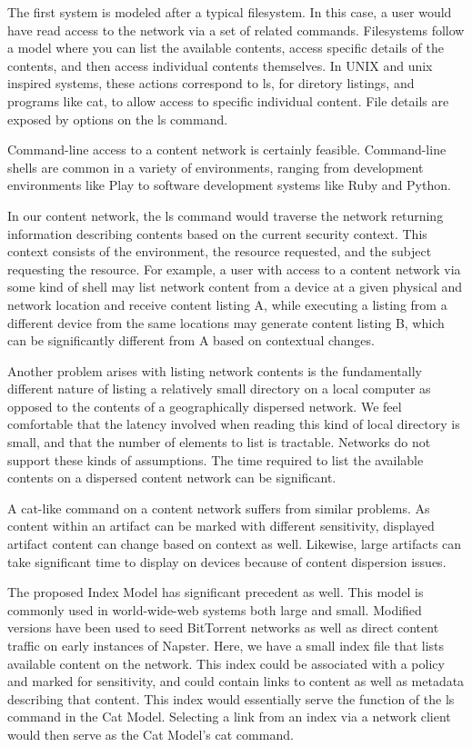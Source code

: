 The first system is modeled after a typical filesystem.  In this case, a user would have read access to the network via a set of related commands.  Filesystems follow a model where you can list the available contents, access specific details of the contents, and then access individual contents themselves.  In UNIX and unix inspired systems, these actions correspond to ls, for diretory listings, and programs like cat, to allow access to specific individual content.  File details are exposed by options on the ls command.

Command-line access to a content network is certainly feasible.  Command-line shells are common in a variety of environments, ranging from development environments like Play to software development systems like Ruby and Python.

In our content network, the ls command would traverse the network returning information describing contents based on the current security context.  This context consists of the environment, the resource requested, and the subject requesting the resource.  For example, a user with access to a content network via some kind of shell may list network content from a device at a given physical and network location and receive content listing A, while executing a listing from a different device from the same locations may generate content listing B, which can be significantly different from A based on contextual changes.

Another problem arises with listing network contents is the fundamentally different nature of listing a relatively small directory on a local computer as opposed to the contents of a geographically dispersed network.  We feel comfortable that the latency involved when reading this kind of local directory is small, and that the number of elements to list is tractable.  Networks do not support these kinds of assumptions.  The time required to list the available contents on a dispersed content network can be significant.

A cat-like command on a content network suffers from similar problems.  As content within an artifact can be marked with different sensitivity, displayed artifact content can change based on context as well.  Likewise, large artifacts can take significant time to display on devices because of content dispersion issues.

The proposed Index Model has significant precedent as well.  This model is commonly used in world-wide-web systems both large and small.  Modified versions have been used to seed BitTorrent networks as well as direct content traffic on early instances of Napster.  Here, we have a small index file that lists available content on the network.  This index could be associated with a policy and marked for sensitivity, and could contain links to content as well as metadata describing that content.  This index would essentially serve the function of the ls command in the Cat Model.  Selecting a link from an index via a network client would then serve as the Cat Model's cat command.

